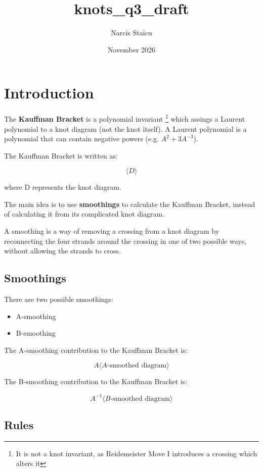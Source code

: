 \documentclass{article}
\title{knots\_q3\_draft}
\author{Narcis Staicu}
\date{November 2026}
\begin{document}
\maketitle

\section{Introduction}

The \textbf{Kauffman Bracket} is a polynomial invariant \footnote{It is not a knot invariant, as Reidemeister Move I introduces a crossing which alters it} which assings a Laurent polynomial to a knot diagram (not the knot itself). A Laurent polynomial is a polynomial that can contain negative powers (e.g. $A^2 + 3A^{-3}$).

The Kauffman Bracket is written as:

\[
    \langle D \rangle
\]

where D represents the knot diagram.

\hfill

The main idea is to use \textbf{smoothings} to calculate the Kauffman Bracket, instead of calculating it from its complicated knot diagram.

\hfill

A smoothing is a way of removing a crossing from a knot diagram by reconnecting the four strands around the crossing in one of two possible ways, without allowing the strands to cross. 

\hfill

\subsection{Smoothings}

There are two possible smoothings:
\begin{itemize}
    \item A-smoothing
    \item B-smoothing
\end{itemize}

The A-smoothing contribution to the Kauffman Bracket is:

\[
    A \langle A\text{-smoothed diagram} \rangle
\]

The B-smoothing contribution to the Kauffman Bracket is:

\[
    A^{-1} \langle B\text{-smoothed diagram} \rangle
\]

\subsection{Rules}
\end{document}
